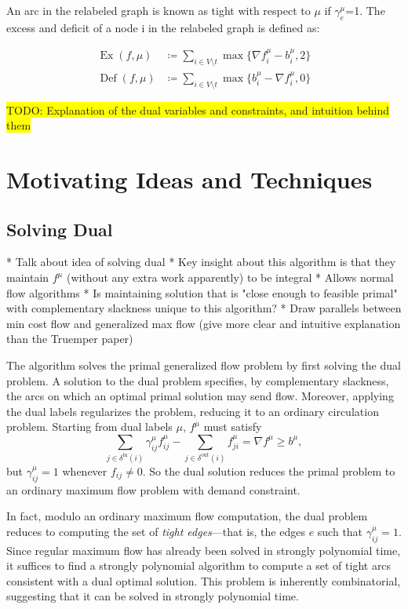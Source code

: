 \documentclass[12pt]{article}
\theoremstyle{definition}
\newcommand{\fu}{f^{\mu}}
\newcommand{\nfiu}{\nabla \fu_i}
\newcommand{\biu}{b_{i}^{\mu}}
\newcommand{\gij}{\gamma_{ij}}
\newcommand{\gie}{\gij^{\mu}}
\newcommand{\giij}{\gamma_{ij}^{\mu}}
\newcommand{\din}{\delta^{\text{in}}}
\newcommand{\dout}{\delta^{\text{out}}}
\DeclareMathOperator{\Ex}{Ex}
\DeclareMathOperator{\Def}{Def}
\newcommand{\todo}[1]{\colorbox{yellow}{TODO: #1}}
\begin{document}
An arc in the relabeled graph is known as tight with respect to $\mu$ if $\gamma_e^\mu$=1. The excess and deficit of a node i in the relabeled graph is defined as:


\begin{align*}
\Ex(f,\mu)  &\coloneqq \sum_{i \in V \setminus t} \max \{ \nfiu - \biu, 2 \} \\
\Def(f,\mu) &\coloneqq \sum_{i \in V \setminus t} \max \{ \biu - \nfiu, 0 \}
\end{align*}

\todo{Explanation of the dual variables and constraints, and intuition behind them}
  
\section{Motivating Ideas and Techniques}
	\subsection{Solving Dual}
    	* Talk about idea of solving dual 
        	* Key insight about this algorithm is that they maintain $f^{\mu}$ (without any extra work apparently) to be integral
            * Allows normal flow algorithms 
            * Is maintaining solution that is "close enough to feasible primal" with complementary slackness unique to this algorithm?
            * Draw parallels between min cost flow and generalized max flow (give more clear and intuitive explanation than the Truemper paper)
            
	The algorithm solves the primal generalized flow problem by first solving the dual problem.
    A solution to the dual problem specifies, by complementary slackness, the arcs on which an optimal
    primal solution may send flow. Moreover, applying the dual labels regularizes the problem, reducing
    it to an ordinary circulation problem. Starting from dual labels $\mu$, $f^{\mu}$ must satisfy
    \[ \sum_{j \in \din(i)} \giij \fu_{ij} - \sum_{j \in \dout(i)} \fu_{ji}
     = \nabla f^{\mu} \geq b^{\mu}, \]
    but $\giij = 1$ whenever $f_{ij} \neq 0$. So the dual solution reduces the primal problem
    to an ordinary maximum flow problem with demand constraint.
    
    In fact, modulo an ordinary maximum flow computation, the dual problem reduces to computing
    the set of \emph{tight edges}---that is, the edges $e$ such that $\gie = 1$. Since regular maximum
    flow has already been solved in strongly polynomial time, it suffices to find a strongly polynomial
    algorithm to compute a set of tight arcs consistent with a dual optimal solution. This problem
    is inherently combinatorial, suggesting that it can be solved in strongly polynomial time.
    
\end{document}
